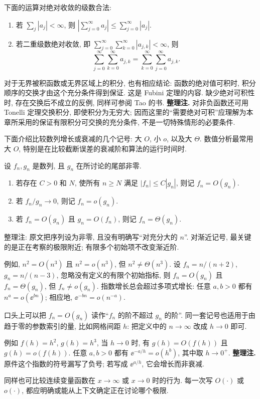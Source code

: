 \begin{theorem}\label{thm:absolute-operations}
下面的运算对绝对收敛的级数合法:
\begin{enumerate}
\item 若 $\sum_j|a_j|<\infty$, 则 $\left|\sum_{j=0}^{\infty}a_j\right|\leq\sum_{j=0}^{\infty}|a_j|$.
\item 若二重级数绝对收敛, 即 $\sum_{j=0}^{\infty}\sum_{k=0}^{\infty}|a_{j,k}|<\infty$, 则
\[
\sum_{j=0}^{\infty}\sum_{k=0}^{\infty}a_{j,k}=\sum_{k=0}^{\infty}\sum_{j=0}^{\infty}a_{j,k}.
\]
\end{enumerate}
\end{theorem}

对于无界被积函数或无界区域上的积分, 也有相应结论: 函数的绝对值可积时, 积分顺序的交换才由这个充分条件得到保证. 这是 Fubini 定理的内容. 缺少绝对可积性时, 存在交换后不成立的反例, 同样可参阅 Tao 的书. \textbf{整理注.} 对非负函数还可用 Tonelli 定理交换积分, 即使积分为无穷大; 因而这里的“需要绝对可积”应理解为本章所采用的保证有限积分可交换的充分条件, 不是一切特殊情形的必要条件.


下面介绍比较数列增长或衰减的几个记号: 大 $O$, 小 $o$, 以及大 $\Theta$. 数值分析最常用大 $O$, 特别是在比较截断误差的衰减阶和算法的运行时间时.

\begin{definition}\label{def:asymptotic}
设 $f_n,g_n$ 是数列, 且 $g_n$ 在所讨论的尾部非零.
\begin{enumerate}
\item 若存在 $C>0$ 和 $N$, 使所有 $n\geq N$ 满足 $|f_n|\leq C|g_n|$, 则记 $f_n=O(g_n)$.
\item 若 $f_n/g_n\to0$, 则记 $f_n=o(g_n)$.
\item 若 $f_n=O(g_n)$ 且 $g_n=O(f_n)$, 则记 $f_n=\Theta(g_n)$.
\end{enumerate}
\end{definition}

整理注: 原文把序列设为非零, 且没有明确写“对充分大的 $n$”. 对渐近记号, 最关键的是正在考察的极限附近; 有限多个初始项不改变渐近阶.

例如, $n^2=O(n^3)$ 且 $n^2=o(n^3)$, 但 $n^2\neq\Theta(n^3)$. 设 $f_n=n/(n+2)$, $g_n=n/(n-3)$, 忽略没有定义的有限个初始指标, 则 $f_n=O(g_n)$ 且 $f_n=\Theta(g_n)$, 但 $f_n\neq o(g_n)$. 指数增长总会超过多项式增长: 任意 $a,b>0$ 都有 $n^a=o(\ee^{bn})$; 相应地, $\ee^{-bn}=o(n^{-a})$.

口头上可以把 $f_n=O(g_n)$ 读作“$f_n$ 的阶不超过 $g_n$ 的阶”. 同一套记号也适用于由趋于零的参数索引的量, 比如网格间距 $h$: 把定义中的 $n\to\infty$ 改成 $h\to0$ 即可.

例如 $f(h)=h^2$, $g(h)=h^3$, 当 $h\to0$ 时, 有 $g(h)=O(f(h))$ 且 $g(h)=o(f(h))$. 任意 $a,b>0$ 都有 $\ee^{-a/h}=o(h^b)$, 其中取 $h\to0^+$. \textbf{整理注.} 原件这个指数的符号漏写了负号; 若写成 $\ee^{a/h}$, 它会增长而非衰减.

同样也可比较连续变量函数在 $x\to\infty$ 或 $x\to0$ 时的行为. 每一次写 $O(\cdot)$ 或 $o(\cdot)$, 都应明确或能从上下文确定正在讨论哪个极限.
